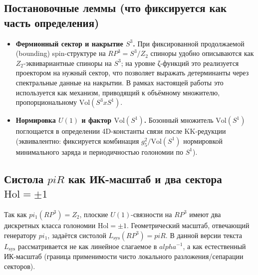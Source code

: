 \documentclass[12pt]{article}
\def\mathbb#1{#1}%
\def\alpha{alpha}%
\def\pi{pi}%
\def\times{x}%
\begin{document}
\subsection{Постановочные леммы (что фиксируется как часть определения)}
\begin{itemize}
  \item \textbf{Фермионный сектор и накрытие $S^3$.}
  При фиксированной продолжаемой (bounding) spin-структуре на $\mathbb{RP}^3=S^3/\mathbb{Z}_2$ спиноры удобно описываются как $\mathbb{Z}_2$-эквивариантные спиноры на $S^3$; на уровне ζ-функций это реализуется проектором на нужный сектор, что позволяет выражать детерминанты через спектральные данные на накрытии. В рамках настоящей работы это используется как механизм, приводящий к объёмному множителю, пропорциональному $\mathrm{Vol}(S^3\times S^1)$.\cite{bar,ikeda}

  \item \textbf{Нормировка $U(1)$ и фактор $\mathrm{Vol}(S^1)$.}
  Бозонный множитель $\mathrm{Vol}(S^1)$ поглощается в определении 4D-константы связи после KK-редукции (эквивалентно: фиксируется комбинация $g_5^2/\mathrm{Vol}(S^1)$ нормировкой минимального заряда и периодичностью голономии по $S^1$).
\end{itemize}

\subsection{Систола $\pi R$ как ИК-масштаб и два сектора $\mathrm{Hol}=\pm 1$}
Так как $\pi_1(\mathbb{RP}^3)=\mathbb{Z}_2$, плоские $U(1)$-связности на $\mathbb{RP}^3$ имеют два дискретных класса голономии $\mathrm{Hol}=\pm 1$.
Геометрический масштаб, отвечающий генератору $\pi_1$, задаётся систолой $L_{\mathrm{sys}}(\mathbb{RP}^3)=\pi R$.
В данной версии текста $L_{\mathrm{sys}}$ рассматривается не как линейное слагаемое в $\alpha^{-1}$, а как естественный ИК-масштаб (граница применимости чисто локального разложения/сепарации секторов).
\end{document}
